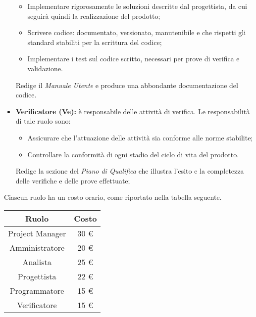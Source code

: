 \begin{itemize}
			\begin{itemize}
				\item Implementare rigorosamente le soluzioni descritte dal progettista, da cui
seguirà quindi la realizzazione del prodotto;
				\item Scrivere codice: documentato, versionato, manutenibile e che rispetti gli
standard stabiliti per la scrittura del codice;
				\item Implementare i test sul codice scritto, necessari per prove di verifica e validazione. \\
			\end{itemize}
			Redige il \textit{Manuale Utente} e produce una abbondante documentazione del codice.
			\item \textbf{Verificatore (Ve):} è responsabile delle attività di verifica. Le responsabilità di tale ruolo sono: \\
			\begin{itemize}
				\item Assicurare che l'attuazione delle attività sia conforme alle norme stabilite;
				\item Controllare la conformità di ogni stadio del ciclo di vita del prodotto. \\
			\end{itemize}
			Redige la sezione del \textit{Piano di Qualifica} che illustra l'esito e la completezza delle verifiche e delle prove effettuate;
		\end{itemize}
		Ciascun ruolo ha un costo orario, come riportato nella tabella seguente. \\
		\begin{table}[H]
		\centering
		\begin{tabular}{|c|c|}
			\hline
			\textbf{Ruolo}		& \textbf{Costo} \\
			\hline
			Project Manager		& 30 €\\
			Amministratore		& 20 €\\
			Analista			& 25 €\\
			Progettista			& 22 €\\
			Programmatore		& 15 €\\
			Verificatore		& 15 €\\
			\hline
		\end{tabular}
		\end{table}